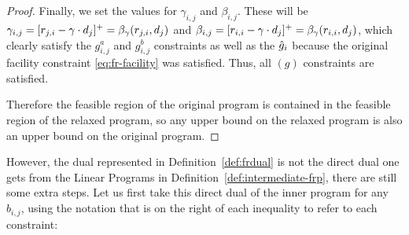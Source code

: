 \begin{proof}
Finally, we set the values for $\gamma_{i,j}$ and $\beta_{i,j}$. These will be $\gamma_{i,j} = [r_{j,i}-\gamma \cdot d_j]^+  =\beta_{\gamma}(r_{j,i},d_j)$ and $\beta_{i,j} = [r_{i,i}-\gamma\cdot d_j]^+=\beta_{\gamma}(r_{i,i},d_j)$, which clearly satisfy the $g^a_{i,j}$ and $g^b_{i,j}$ constraints as well as the $\hat{g}_i$ because the original facility constraint \ref{eq:fr-facility} was satisfied. Thus, all $(g)$ constraints are satisfied.

Therefore the feasible region of the original program is contained in the feasible region of the relaxed program, so any upper bound on the relaxed program is also an upper bound on the original program.
\end{proof}

However, the dual represented in Definition~\ref{def:frdual} is not the direct dual one gets from the Linear Programs in Definition~\ref{def:intermediate-frp}, there are still some extra steps. Let us first take this direct dual of the inner program for any $b_{i,j}$, using the notation that is on the right of each inequality to refer to each constraint:
